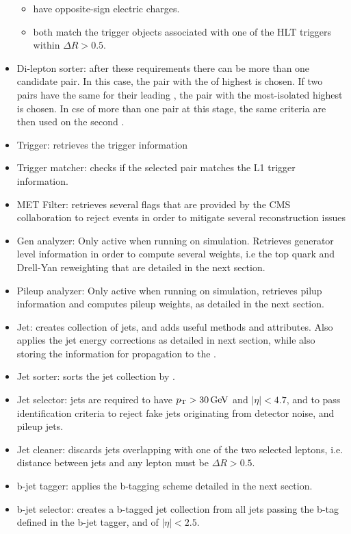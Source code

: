 \begin{itemize}
\begin{itemize}
    \item have opposite-sign electric charges.
    \item both match the trigger objects associated with one of the HLT triggers within $\Delta R > 0.5$.
    \end{itemize}
    \item Di-lepton sorter: after these requirements there can be more than one candidate pair. In this case, the pair with the \tauh of highest \pt is chosen. If two pairs have the same \pt for their leading \tauh, the pair with the most-isolated highest \pt \tauh is chosen. In cse of more than one pair at this stage, the same criteria are then used on the second \tauh.
    \item Trigger: retrieves the trigger information
    \item Trigger matcher: checks if the selected \tauh pair matches the L1 trigger information.
    \item MET Filter: retrieves several flags that are provided by the CMS collaboration to reject events in order to mitigate several \MET reconstruction issues
    \item Gen analyzer: Only active when running on simulation. Retrieves generator level information in order to compute several weights, i.e the top quark and Drell-Yan \pt reweighting that are detailed in the next section.
    \item Pileup analyzer: Only active when running on simulation, retrieves pilup information and computes pileup weights, as detailed in the next section.
    \item Jet: creates collection of jets, and adds useful methods and attributes. Also applies the jet energy corrections as detailed in next section, while also storing the information for propagation to the \MET.
    \item Jet sorter: sorts the jet collection by \pt.
    \item Jet selector: jets are required to have $p_{\mathrm{T}} > 30\,\mathrm{GeV}$ and $|\eta| < 4.7$, and to pass identification criteria to reject fake jets originating from detector noise, and pileup jets.
    \item Jet cleaner: discards jets overlapping with one of the two selected leptons, i.e. distance between jets and any lepton must be $\Delta R > 0.5$.
    \item b-jet tagger: applies the b-tagging scheme detailed in the next section.
    \item b-jet selector: creates a b-tagged jet collection from all jets passing the b-tag defined in the b-jet tagger, and of $|\eta|<2.5$.

\end{itemize}
